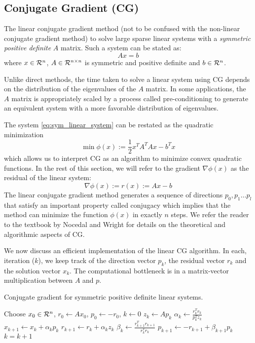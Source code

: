\subsection{Conjugate Gradient (CG)}
The linear conjugate gradient method (not to be confused with the non-linear
conjugate gradient method) to solve large sparse linear systems with a 
{\it symmetric positive definite} $A$ matrix. Such a system can be stated as: 
\begin{equation}
  \label{eq:sym_linear_system}
  Ax = b
\end{equation}
where $x \in \mathcal{R}^{n}$, $A \in \mathcal{R}^{n \times n}$ is symmetric and positive 
definite and $b \in \mathcal{R}^{n}$. 

Unlike direct methods, the time taken to solve a linear system using CG depends on the 
distribution of the eigenvalues of the $A$ matrix. In some applications, 
the $A$ matrix is appropriately scaled by a process called pre-conditioning to 
generate an equivalent system with a more favorable distribution of eigenvalues.


The system \eqref{eq:sym_linear_system} can be restated as the quadratic minimization
$$
  \min \phi(x) := \frac{1}{2} x^T A^T A x - b^T x
$$
which allows us to interpret CG as an algorithm to minimize convex quadratic
functions. In the rest of this section, we will refer to the gradient $\nabla \phi(x)$
as the residual of the linear system:
$$
  \nabla \phi(x) := r(x) := Ax - b
$$
The linear conjugate gradient method generates a sequence of directions ${p_0, p_1 \ldots p_l}$
that satisfy an important property called conjugacy which implies that the method
can minimize the function $\phi(x)$ in exactly $n$ steps. We refer the reader 
to the textbook by Nocedal and Wright \cite{nocedal2006numerical} for details on the 
theoretical and algorithmic aspects of CG.

We now discuss an efficient implementation of the linear CG algorithm. In each, 
iteration ($k$), we keep track of the direction vector $p_k$, the residual
vector $r_k$ and the solution vector $x_k$. The computational bottleneck
is in a matrix-vector multiplication between $A$ and $p$.

\begin{algorithm}[CG]\label{alg:cg}
\caption{Conjugate gradient for symmetric positive definite linear systems.}
\begin{algorithmic}
\State Choose $x_0 \in \mathcal{R}^n$, $r_0 \leftarrow Ax_0$, $p_0 \leftarrow -r_0$, $k \leftarrow 0$ 
  \State$z_k \leftarrow Ap_k$ 
  \State$\alpha_k \leftarrow \frac{r_k^T r_k}{p_k^T z_k}$ 
  \State$x_{k+1} \leftarrow x_k + \alpha_k p_k$ 
  \State$r_{k+1} \leftarrow r_k + \alpha_k z_k$ 
  \State$\beta_k \leftarrow \frac{r_{k+1}^T r_{k+1}}{r_k^T r_k}$ 
  \State$p_{k+1} \leftarrow -r_{k+1} + \beta_{k+1} p_k$ 
  \State$k = k + 1$ 
\EndWhile
\end{algorithmic}
\end{algorithm}


